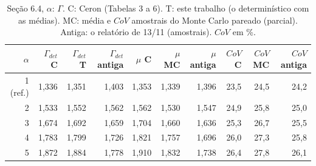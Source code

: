 \begin{table}[htbp]\centering\scriptsize\setlength{\tabcolsep}{3pt}
\caption{Seção 6.4, $\alpha$: $\Gamma$. C: Ceron (Tabelas 3 a 6). T: este trabalho (o determinístico com as médias). MC: média e $CoV$ amostrais do Monte Carlo pareado (parcial). Antiga: o relatório de 13/11 (amostrais). $CoV$ em \%.}\label{tab:g_alfa}
\begin{tabular}{rrrrrrrrrr}\toprule
$\alpha$ & $\Gamma_{det}$ C & $\Gamma_{det}$ T & $\Gamma_{det}$ antiga & $\mu$ C & $\mu$ MC & $\mu$ antiga & $CoV$ C & $CoV$ MC & $CoV$ antiga \\\midrule
1 (ref.) & 1{,}336 & 1{,}351 & 1{,}403 & 1{,}353 & 1{,}339 & 1{,}396 & 23{,}5 & 24{,}5 & 24{,}2 \\
2 & 1{,}533 & 1{,}552 & 1{,}562 & 1{,}562 & 1{,}530 & 1{,}547 & 24{,}9 & 25{,}8 & 25{,}0 \\
3 & 1{,}674 & 1{,}692 & 1{,}659 & 1{,}704 & 1{,}660 & 1{,}636 & 25{,}3 & 26{,}7 & 25{,}5 \\
4 & 1{,}783 & 1{,}799 & 1{,}726 & 1{,}821 & 1{,}757 & 1{,}696 & 26{,}0 & 27{,}3 & 25{,}8 \\
5 & 1{,}872 & 1{,}884 & 1{,}778 & 1{,}910 & 1{,}832 & 1{,}738 & 26{,}4 & 27{,}8 & 26{,}1 \\
\bottomrule\end{tabular}\end{table}
